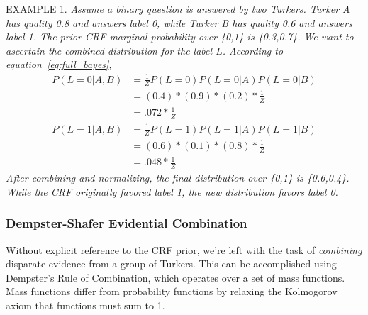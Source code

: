 EXAMPLE 1. \textit{
Assume a binary question is answered by two Turkers.  Turker A has quality 0.8 and answers label 0, while Turker B has quality 0.6 and answers label 1.  The prior CRF marginal probability over \{0,1\} is \{0.3,0.7\}.  We want to ascertain the combined distribution for the label $L$.  According to equation~\ref{eq:full_bayes}, 
\begin{align}
P(L=0|A,B) &= \frac{1}{Z}P(L=0)P(L=0|A)P(L=0|B)\nonumber\\
	        &= (0.4)*(0.9)*(0.2)*\frac{1}{Z}\nonumber\\
	        &= .072*\frac{1}{Z}\\
P(L=1|A,B) &= \frac{1}{Z}P(L=1)P(L=1|A)P(L=1|B)\nonumber\\
	        &= (0.6)*(0.1)*(0.8)*\frac{1}{Z}\nonumber\\
	        &= .048*\frac{1}{Z}
\end{align}
After combining and normalizing, the final distribution over \{0,1\} is \{0.6,0.4\}.  While the CRF originally favored label 1, the new distribution favors label 0.
}

\subsubsection{Dempster-Shafer Evidential Combination}

Without explicit reference to the CRF prior, we're left with the task of \textit{combining} disparate evidence from a group of Turkers.  This can be accomplished using Dempster's Rule of Combination, which operates over a set of mass functions.  Mass functions differ from probability functions by relaxing the Kolmogorov axiom that functions must sum to 1.


